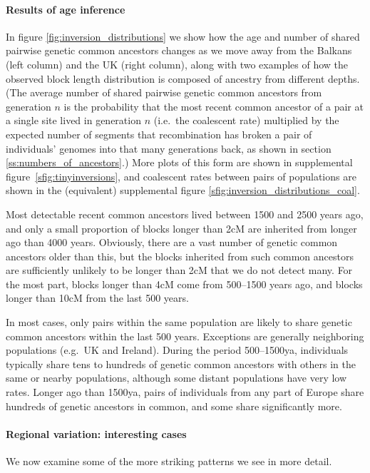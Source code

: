 \documentclass{article}
\begin{document}
\paragraph{Results of age inference}
In figure \ref{fig:inversion_distributions} we show
how the age and number of shared pairwise genetic common ancestors changes as we move away from the Balkans (left column) and the UK (right column),
along with two examples of how the observed block length distribution 
is composed of ancestry from different depths.
(The average number of shared pairwise genetic common ancestors from generation $n$
is the probability that the most recent common ancestor of a pair at a single site lived in generation $n$ (i.e.~the coalescent rate)
multiplied by the expected number of segments that recombination has broken a pair of individuals' genomes into that many generations back, 
as shown in section \ref{ss:numbers_of_ancestors}.)
More plots of this form are shown in supplemental figure~\ref{sfig:tinyinversions}, and
coalescent rates between pairs of populations are shown in the (equivalent) supplemental figure \ref{sfig:inversion_distributions_coal}.


Most detectable recent common ancestors lived between 1500 and 2500 years ago,
and only a small proportion of blocks longer than 2cM are inherited from longer ago than 4000 years.
Obviously, there are a vast number of genetic common ancestors older than this,
but the blocks inherited from such common ancestors are sufficiently unlikely to be longer than 2cM
that we do not detect many.
For the most part, blocks longer than 4cM come from 500--1500 years ago,
and blocks longer than 10cM from the last 500 years.


In most cases, only pairs within the same population are likely to share genetic common ancestors within the last 500 years.
Exceptions are generally neighboring populations (e.g.\ UK and Ireland).
During the period 500--1500ya, individuals typically share tens to hundreds of genetic common ancestors
with others in the same or nearby populations,
although some distant populations have very low rates.
Longer ago than 1500ya, pairs of individuals from any part of Europe share hundreds of genetic ancestors in common,
and some share significantly more.


\paragraph{Regional variation: interesting cases}
We now examine some of the more striking patterns we see in more detail.
\end{document}

